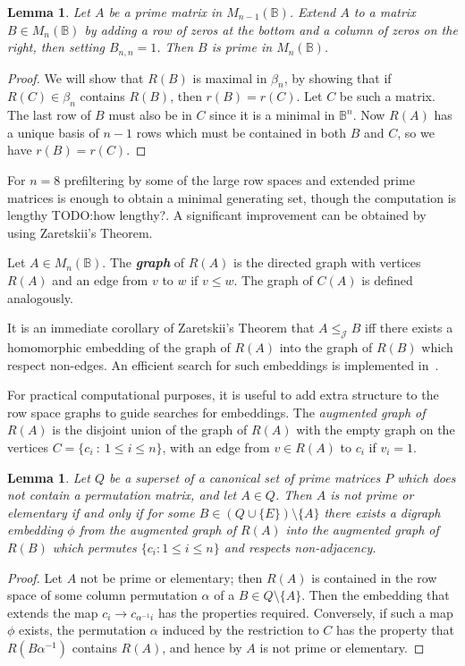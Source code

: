 \documentclass[11pt]{article}
\newtheorem{lemma}[thm]{Lemma}
\newcommand{\defn}[1]{\textbf{\textit{#1}}}
\numberwithin{equation}{section}
\renewcommand{\to}{\longrightarrow}
\newcommand{\B}{\mathbb{B}}
\newcommand{\Bn}{M_n(\B)}
\newcommand{\J}{\mathscr{J}}
\begin{document}
\begin{lemma}
  Let $A$ be a prime matrix in $M_{n-1}(\B)$. Extend $A$ to a matrix $B \in \Bn$
  by adding a row of zeros at the bottom and a column of zeros on the right,
  then setting $B_{n,n} = 1$. Then $B$ is prime in $\Bn$.
\end{lemma}
\begin{proof}
  We will show that $R(B)$ is maximal in $\beta_n$, by showing that if 
  $R(C) \in \beta_n$ contains $R(B)$, then $r(B) = r(C)$.
  Let $C$ be such a matrix.
  The last row of $B$ must also be in $C$ since it is a minimal in $\B^{n}$. 
  Now $R(A)$ has a unique basis of $n-1$ rows which must be contained in both $B$ and
  $C$, so we have $r(B) = r(C)$.
\end{proof}

For $n=8$ prefiltering by some of the large row spaces and extended prime
matrices is enough to obtain a minimal generating set, though the computation is
lengthy TODO:how lengthy?. A significant improvement can be obtained by using
Zaretskii's Theorem.

Let $A \in \Bn$. The \defn{graph} of $R(A)$ is the directed graph with vertices
$R(A)$ and an edge from $v$ to $w$ if $v \leq w$. The graph of $C(A)$ is defined
analogously.

It is an immediate corollary of Zaretskii's Theorem that $A \leq_{\J} B$ iff
there exists a homomorphic embedding of the graph of $R(A)$ into the graph of
$R(B)$ which respect non-edges. An efficient search for such embeddings is
implemented in~\cite{Digraphs2020aa}.

For practical computational purposes, it is useful to add extra structure to the
row space graphs to guide searches for embeddings. The \emph{augmented graph of
  $R(A)$} is the disjoint union of the graph of $R(A)$ with the empty graph on
the vertices $C = \{c_i \: : \: 1 \leq i \leq n\}$, with an edge from $v \in R(A)$
to $c_i$ if $v_i = 1$.

\begin{lemma}
  Let $Q$ be a superset of a canonical set of prime matrices $P$ which does not
  contain a permutation matrix, and let $A \in
  Q$. Then $A$ is not prime or elementary if and only if for some $B \in
  (Q\cup\{E\})\setminus\{A\}$ there exists a digraph embedding
  $\phi$ from the augmented graph of $R(A)$ into the augmented graph of $R(B)$
  which permutes $\{ c_i : 1 \leq i \leq n \}$ and respects non-adjacency.
\end{lemma}
\begin{proof}
  Let $A$ not be prime or elementary; then $R(A)$ is contained in the row space
  of some column permutation $\alpha$ of a $B \in Q \setminus \{A\}$.
  Then the embedding that extends the map $c_i \to c_{\alpha^{-1}i}$ has the
  properties required. Conversely, if such a map $\phi$ exists, the permutation
  $\alpha$ induced by the restriction to $C$ has the property that
  $R(B\alpha^{-1})$ contains $R(A)$, and hence by 
  $A$ is not prime or elementary. 
\end{proof}
\end{document}

